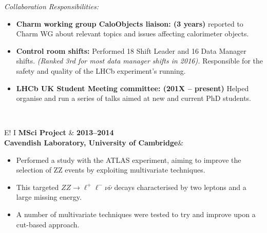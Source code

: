 \documentclass[11pt,a4paper]{article}
\newcommand\VRule{\color{lightgray}\vrule width 0.5pt}
\begin{document}
\noindent\emph{Collaboration Responsibilities:} 
\begin{itemize}
\setlength\itemsep{0em}
\item {\bf Charm working group CaloObjects liaison: (3 years)} reported to Charm WG about relevant topics and issues affecting calorimeter objects.  

\item {\bf Control room shifts:} Performed 18 Shift Leader and 16 Data Manager shifts. \emph{(Ranked 3rd for most data manager shifts in 2016).} Responsible for the safety and quality of the LHCb experiment's running.
\item {\bf LHCb UK Student Meeting committee: (201X -- present)} Helped organise and run a series of talks aimed at new and current PhD students.
\end{itemize}
~ 

\noindent\begin{tabular}{E!{\VRule} I }
{\bf MSci Project}   & {\bf2013--2014}\\
{\bf Cavendish Laboratory, University of Cambridge}&\\
\end{tabular}

\noindent
\begin{itemize}
\setlength\itemsep{0em}
\item Performed a study with the ATLAS experiment, aiming to improve the selection of ZZ events by exploiting multivariate techniques. 
\item This targeted $ZZ \to \ell^{+}\ell^{-} \nu \bar{\nu}$ decays characterised by two leptons and a large missing energy. 
\item A number of multivariate techniques were tested to try and improve upon a cut-based approach.\\
\end{itemize}
\end{document}

